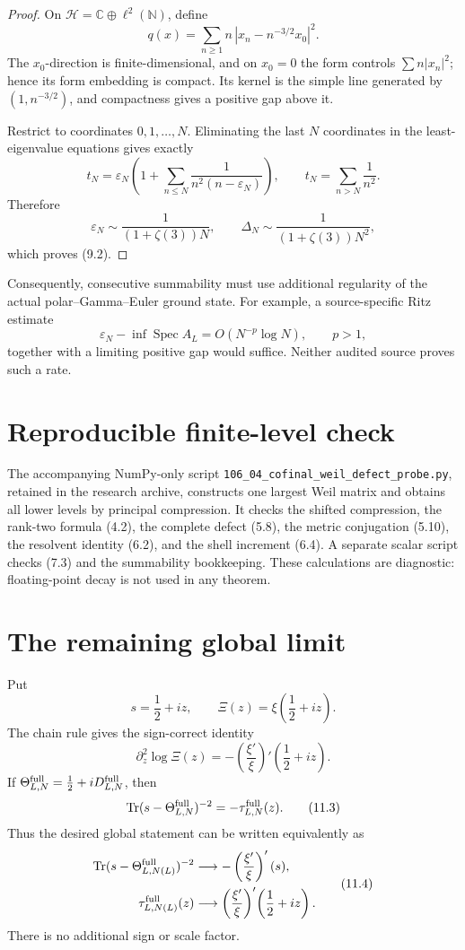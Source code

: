 \documentclass[11pt]{amsart}
\theoremstyle{definition}
\theoremstyle{remark}
\newcommand{\C}{\mathbb C}
\newcommand{\Spec}{\operatorname{Spec}}
\newcommand{\Tr}{\operatorname{Tr}}
\newcommand{\XiR}{\Xi}
\newcommand{\eps}{\varepsilon}
\begin{document}
\begin{proof}
On \(\mathcal H=\C\oplus\ell^2(\mathbb N)\), define
\[
 q(x)=\sum_{n\ge1}n\,|x_n-n^{-3/2}x_0|^2.
\tag{9.3}
\]
The \(x_0\)-direction is finite-dimensional, and on \(x_0=0\) the form
controls \(\sum n|x_n|^2\); hence its form embedding is compact.  Its kernel
is the simple line generated by \((1,n^{-3/2})\), and compactness gives a
positive gap above it.

Restrict to coordinates \(0,1,\ldots,N\).  Eliminating the last \(N\)
coordinates in the least-eigenvalue equations gives exactly
\[
 t_N=\eps_N\left(1+\sum_{n\le N}\frac{1}{n^2(n-\eps_N)}\right),
 \qquad t_N=\sum_{n>N}\frac{1}{n^2}.
\tag{9.4}
\]
Therefore
\[
 \eps_N\sim\frac{1}{(1+\zeta(3))N},
 \qquad
 \Delta_N\sim\frac{1}{(1+\zeta(3))N^2},
\tag{9.5}
\]
which proves (9.2).
\end{proof}

Consequently, consecutive summability must use additional regularity of the
actual polar--Gamma--Euler ground state.  For example, a source-specific
Ritz estimate
\[
 \eps_N-\inf\Spec A_L=O(N^{-p}\log N),\qquad p>1,
\tag{9.6}
\]
together with a limiting positive gap would suffice.  Neither audited source
proves such a rate.

\section{Reproducible finite-level check}

The accompanying NumPy-only script
\texttt{106\_04\_cofinal\_weil\_defect\_probe.py}, retained in the research
archive, constructs one largest Weil matrix and obtains all lower levels by
principal compression.  It checks the shifted compression, the rank-two
formula (4.2), the complete defect (5.8), the metric conjugation (5.10), the
resolvent identity (6.2), and the shell increment (6.4).  A separate scalar
script checks (7.3) and the summability bookkeeping.  These calculations are
diagnostic: floating-point decay is not used in any theorem.

\section{The remaining global limit}
\label{sec:global}

Put
\[
 s=\frac12+iz,
 \qquad \XiR(z)=\xi\!\left(\frac12+iz\right).
\tag{11.1}
\]
The chain rule gives the sign-correct identity
\[
\boxed{
 \partial_z^2\log\XiR(z)
 =-\left(\frac{\xi'}{\xi}\right)'\!\left(\frac12+iz\right).}
\tag{11.2}
\]
If \(\Theta_{L,N}^{\rm full}=\frac12+iD_{L,N}^{\rm full}\), then
\[
 \Tr(s-\Theta_{L,N}^{\rm full})^{-2}
 =-\tau_{L,N}^{\rm full}(z).
\tag{11.3}
\]
Thus the desired global statement can be written equivalently as
\[
\begin{aligned}
 \Tr(s-\Theta_{L,N(L)}^{\rm full})^{-2}
 &\longrightarrow-\left(\frac{\xi'}{\xi}\right)'(s),\\
 \tau_{L,N(L)}^{\rm full}(z)
 &\longrightarrow
 \left(\frac{\xi'}{\xi}\right)'\!\left(\frac12+iz\right).
\end{aligned}
\tag{11.4}
\]
There is no additional sign or scale factor.
\end{document}
